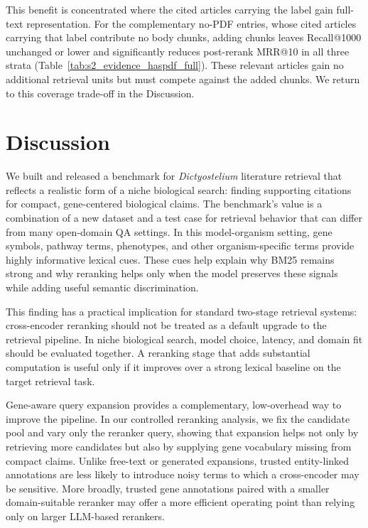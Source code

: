 \documentclass[runningheads]{llncs}
\begin{document}
This benefit is concentrated where the cited articles carrying the label gain full-text representation. For the complementary no-PDF entries, whose cited articles carrying that label contribute no body chunks, adding chunks leaves Recall@1000 unchanged or lower and significantly reduces post-rerank MRR@10 in all three strata (Table~\ref{tab:s2_evidence_haspdf_full}). These relevant articles gain no additional retrieval units but must compete against the added chunks. We return to this coverage trade-off in the Discussion.

\FloatBarrier
\section{Discussion}
\label{sec:discussion}
We built and released a benchmark for \emph{Dictyostelium} literature retrieval that reflects a realistic form of a niche biological search: finding supporting citations for compact, gene-centered biological claims. The benchmark's value is a combination of a new dataset and a test case for retrieval behavior that can differ from many open-domain QA settings. In this model-organism setting, gene symbols, pathway terms, phenotypes, and other organism-specific terms provide highly informative lexical cues. These cues help explain why BM25 remains strong and why reranking helps only when the model preserves these signals while adding useful semantic discrimination.

This finding has a practical implication for standard two-stage retrieval systems: cross-encoder reranking should not be treated as a default upgrade to the retrieval pipeline. In niche biological search, model choice, latency, and domain fit should be evaluated together. A reranking stage that adds substantial computation is useful only if it improves over a strong lexical baseline on the target retrieval task. 

Gene-aware query expansion provides a complementary, low-overhead way to improve the pipeline. In our controlled reranking analysis, we fix the candidate pool and vary only the reranker query, showing that expansion helps not only by retrieving more candidates but also by supplying gene vocabulary missing from compact claims. Unlike free-text or generated expansions, trusted entity-linked annotations are less likely to introduce noisy terms to which a cross-encoder may be sensitive. More broadly, trusted gene annotations paired with a smaller domain-suitable reranker may offer a more efficient operating point than relying only on larger LLM-based rerankers.
\end{document}
